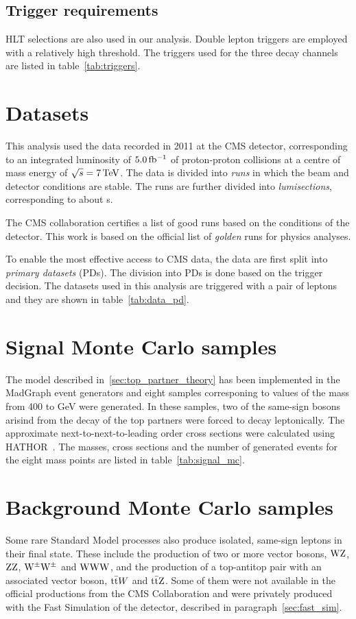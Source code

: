 \subsection{Trigger requirements}\label{sec:triggers}
HLT selections are also used in our analysis. Double lepton triggers are
employed with a relatively high \pt threshold. The triggers used for the
three decay channels are listed in table~\ref{tab:triggers}.


\section{Datasets}
This analysis used the data recorded in 2011 at the CMS detector,
corresponding to an integrated luminosity of $\unit[5.0]{fb^{-1}}$ of
proton-proton collisions at a centre of mass energy of
$\sqrt{s}=\unit[7]{TeV}$.
The data is divided into \emph{runs} in which the beam and detector
conditions are stable. The runs are further divided into
\emph{lumisections}, corresponding to about \unit[23]{s}.

The CMS collaboration certifies a list of good runs based on the conditions
of the detector. This work is based on the official list of \emph{golden}
runs for physics analyses.

To enable the most effective access to CMS data, the data are first split
into \emph{primary datasets} (PDs). The division into PDs is done based on the trigger decision.
The datasets used in this analysis are triggered with a pair of leptons and
they are shown in table~\ref{tab:data_pd}.



\section{Signal Monte Carlo samples}
The model described in~\ref{sec:top_partner_theory} has been implemented in
the MadGraph event generators and eight samples corresponing to values of
the \TP mass from 400 to \unit[750]{GeV} were generated. In these samples,
two of the same-sign \W bosons arisind from the decay of the top partners
were forced to decay leptonically. The approximate next-to-next-to-leading
order cross sections were calculated using HATHOR~\cite{hathor}. The masses,
cross sections and the number of generated events for the eight mass points
are listed in table~\ref{tab:signal_mc}. 



\section{Background Monte Carlo samples}
Some rare Standard Model processes also produce isolated, same-sign leptons
in their final state. These include the production of two or more vector
bosons, $\mathrm{W}\mathrm{Z}$, $\mathrm{Z}\mathrm{Z}$, $\mathrm{W}^\pm\mathrm{W}^\pm$ and $\mathrm{W}\mathrm{W}\mathrm{W}$, and the production of
a top-antitop pair with an associated vector boson, $\mathrm{t}\bar{\mathrm{t}} W$ and
$\mathrm{t}\bar{\mathrm{t}} \mathrm{Z}$. Some of them were not available in the official productions
from the CMS Collaboration and were privately produced with the Fast
Simulation of the detector, described in paragraph~\ref{sec:fast_sim}.

